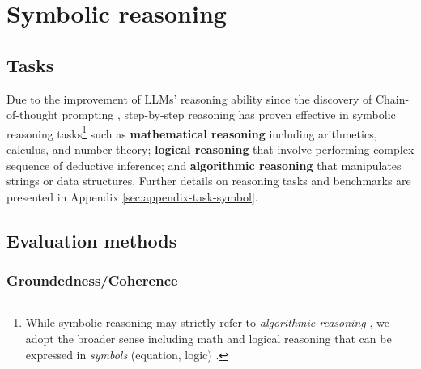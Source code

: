

\section{Symbolic reasoning}
\label{sec:symbolic}

\subsection{Tasks}

Due to the improvement of LLMs' reasoning ability since the discovery of Chain-of-thought prompting \citep{NEURIPS2022_9d560961, NEURIPS2022_8bb0d291}, step-by-step reasoning has proven effective in symbolic reasoning tasks\footnote{While symbolic reasoning may strictly refer to \textit{algorithmic reasoning} \citep{NEURIPS2022_9d560961}, we adopt the broader sense including math and logical reasoning that can be expressed in \textit{symbols} (equation, logic) \citep{sprague2024cotcotchainofthoughthelps}.} such as \textbf{mathematical reasoning} including arithmetics, calculus, and number theory; \textbf{logical reasoning} that involve performing complex sequence of deductive inference; and \textbf{algorithmic reasoning} that manipulates strings or data structures. Further details on reasoning tasks and benchmarks are presented in Appendix \ref{sec:appendix-task-symbol}.

\subsection{Evaluation methods}
\label{sec:reinforcement}

\subsubsection{Groundedness/Coherence}


